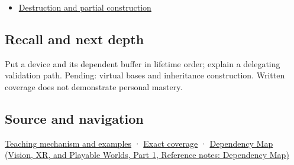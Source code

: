 \hypertarget{appendix-3cb49709605a-used-by}{}

\begin{itemize}
\tightlist
\item
  \hyperref[appendix-9bfe377cef7a]{Destruction and partial construction}
\end{itemize}

\subsection{Recall and next depth}\label{appendix-3cb49709605a-recall-and-next-depth}

\hypertarget{appendix-3cb49709605a-recall-and-next-depth}{}

Put a device and its dependent buffer in lifetime order; explain a delegating validation path. Pending: virtual bases and inheritance construction. Written coverage does not demonstrate personal mastery.

\subsection{Source and navigation}\label{appendix-3cb49709605a-source-and-navigation}

\hypertarget{appendix-3cb49709605a-source-and-navigation}{}

\hyperref[01-foundations-i-ch003-construction-order-records-lifetime-dependencies]{Teaching mechanism and examples} · \hyperref[appendix-fd090d982a15-m009---parts-127-147]{Exact coverage} · \href{../07-Vision-XR-and-Playable-Worlds-P01/main.pdf\#appendix-4ad47bdd269a}{Dependency Map (Vision, XR, and Playable Worlds, Part 1, Reference notes: Dependency Map)}
